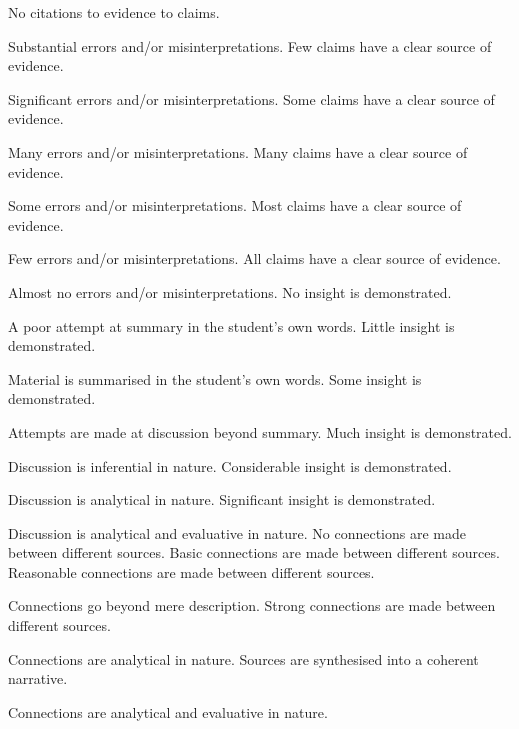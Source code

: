 \documentclass{../../fal_assignment}
\begin{document}
\begin{markingrubric}
%
        \grade\fail 	No citations to evidence to claims.
        \par 		Substantial errors and/or misinterpretations.
        \grade 		Few claims have a clear source of evidence.
        \par 		Significant errors and/or misinterpretations.
        \grade 		Some claims have a clear source of evidence.
        \par 		Many errors and/or misinterpretations.
        \grade 		Many claims have a clear source of evidence.
        \par 		Some errors and/or misinterpretations.
        \grade 		Most claims have a clear source of evidence.
        \par 		Few errors and/or misinterpretations.
        \grade 		All claims have a clear source of evidence.
        \par 		Almost no errors and/or misinterpretations.
%
        \grade\fail No insight is demonstrated.
        \par		A poor attempt at summary in the student's own words.
        \grade		Little insight is demonstrated.
        \par		Material is summarised in the student's own words.
        \grade		Some insight is demonstrated.
        \par		Attempts are made at discussion beyond summary.
        \grade		Much insight is demonstrated.
        \par		Discussion is inferential in nature.
        \grade		Considerable insight is demonstrated.
        \par		Discussion is analytical in nature.
        \grade		Significant insight is demonstrated.
        \par		Discussion is analytical and evaluative in nature.
%
        \grade\fail No connections are made between different sources.
        \grade		Basic connections are made between different sources.
        \grade		Reasonable connections are made between different sources.
        \par		Connections go beyond mere description.
        \grade		Strong connections are made between different sources.
        \par		Connections are analytical in nature.
        \grade		Sources are synthesised into a coherent narrative.
        \par		Connections are analytical and evaluative in nature.

\end{markingrubric}
\end{document}
